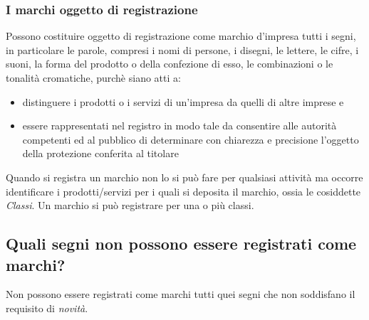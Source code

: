 \subsubsection{I marchi oggetto di registrazione}
Possono costituire oggetto di registrazione come marchio d'impresa tutti i segni, in particolare le parole, compresi i nomi di persone,
i disegni, le lettere, le cifre, i suoni, la forma del prodotto o della confezione di esso, le combinazioni o le tonalità cromatiche, purchè siano atti a:
\begin{itemize}
    \item distinguere i prodotti o i servizi di un'impresa da quelli di altre imprese e
    \item essere rappresentati nel registro in modo tale da consentire alle autorità competenti ed al pubblico di determinare con chiarezza e precisione l'oggetto della
    protezione conferita al titolare
\end{itemize}
Quando si registra un marchio non lo si può fare per qualsiasi attività ma occorre identificare i prodotti/servizi per i quali si deposita il marchio, ossia
le cosiddette \emph{Classi}. Un marchio si può registrare per una o più classi.

\subsection{Quali segni non possono essere registrati come marchi?}
Non possono essere registrati come marchi tutti quei segni che non soddisfano il requisito di \emph{novità}.

